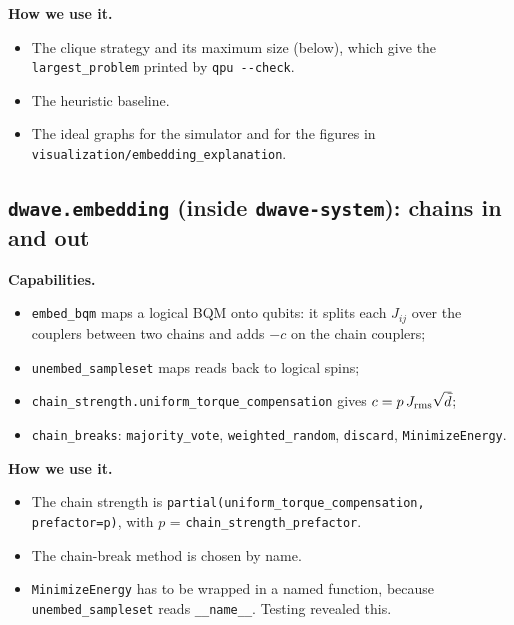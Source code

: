 \documentclass[11pt,a4paper]{article}
\newcommand{\code}[1]{\nolinkurl{#1}}
\newcommand{\src}[4]{}
\begin{document}
\textbf{How we use it.}
\begin{itemize}
\item The clique strategy and its maximum size (below), which give the \code{largest_problem} printed by \code{qpu --check}.
\item The heuristic baseline.
\item The ideal graphs for the simulator and for the figures in \code{visualization/embedding_explanation}.
\end{itemize}
\src{skgame/optim/embedding.py}{\rCliqueA}{\rCliqueB}{the all-to-all strategy: embedding and largest clique}
\src{skgame/optim/embedding.py}{\rChainstatsA}{\rChainstatsB}{chain statistics; \code{n_qubits} feeds the readout-time model}

\subsection{\texorpdfstring{\code{dwave.embedding}}{dwave.embedding} (inside \texorpdfstring{\code{dwave-system}}{dwave-system}): chains in and out}
\textbf{Capabilities.}
\begin{itemize}
\item \code{embed_bqm} maps a logical BQM onto qubits: it splits each $J_{ij}$ over the couplers between two chains and adds $-c$ on the chain couplers;
\item \code{unembed_sampleset} maps reads back to logical spins;
\item \code{chain_strength.uniform_torque_compensation} gives $c=p\,J_{\rm rms}\sqrt{\bar d}$;
\item \code{chain_breaks}: \code{majority_vote}, \code{weighted_random}, \code{discard}, \code{MinimizeEnergy}.
\end{itemize}

\textbf{How we use it.}
\begin{itemize}
\item The chain strength is \code{partial(uniform_torque_compensation, prefactor=p)}, with $p$ = \code{chain_strength_prefactor}.
\item The chain-break method is chosen by name.
\item \code{MinimizeEnergy} has to be wrapped in a named function, because \code{unembed_sampleset} reads \code{__name__}. Testing revealed this.
\end{itemize}
\src{skgame/optim/backends.py}{\rKwargsA}{\rKwargsB}{the keyword arguments for the physical sampler}
\src{skgame/optim/backends.py}{\rCbmA}{\rCbmB}{chain-break resolution by name}
\end{document}
